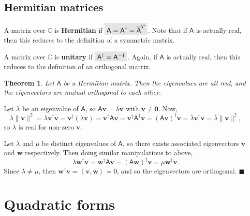 \documentclass[letter-paper]{tufte-book}
\newtheorem{theorem}{\color{pastel-blue}Theorem}[section]
\newenvironment{proof}[1][Proof]{\begin{trivlist}
\item[\hskip \labelsep {\bfseries #1}]}{\end{trivlist}}
\newcommand{\inner}[2]{\left\langle #1, #2\right\rangle}
\newcommand{\As}{{\mathsf{A}}}
\newcommand{\Ob}{{\boldsymbol{0}}}
\newcommand{\vb}{{\boldsymbol{v}}}
\newcommand{\wb}{{\boldsymbol{w}}}
\newcommand{\qed}{\hfill$\blacksquare$}
\newcommand{\highlight}[1]{\mathchoice%
  {\colorbox{black!10}{$\displaystyle#1$}}%
  {\colorbox{black!10}{$\textstyle#1$}}%
  {\colorbox{black!10}{$\scriptstyle#1$}}%
  {\colorbox{black!10}{$\scriptscriptstyle#1$}}}%
\begin{document}
\section{Hermitian matrices}\label{sec:hermitian}

A matrix over $\mathbb{C}$ is \textbf{Hermitian} if $\highlight{\As = \As^\dagger = \overline{\As}^T}$. Note that if $\As$ is actually real, then this reduces to the definition of a symmetric matrix.

A matrix over $\mathbb{C}$ is \textbf{unitary} if $\highlight{\As^\dagger = \As^{-1}}$. Again, if $\As$ is actually real, then this reduces to the definition of an orthogonal matrix.

\begin{theorem}
  Let $\As$ be a Hermitian matrix. Then the eigenvalues are all real, and the eigenvectors are mutual orthogonal to each other.
\end{theorem}

\begin{proof}
  Let $\lambda$ be an eigenvalue of $\As$, so $\As\vb=\lambda\vb$ with $\vb\neq\Ob$. Now,
  \begin{equation*}
    \lambda\|\vb\|^2 = \lambda\vb^\dagger\vb = \vb^\dagger (\lambda\vb) = \vb^\dagger \As\vb = \vb^\dagger \As^\dagger\vb = (\As\vb)^\dagger \vb = \overline{\lambda}\vb^\dagger\vb = \overline{\lambda}\|\vb\|^2,
  \end{equation*}
  so $\lambda$ is real for non-zero $\vb$.
  
  Let $\lambda$ and $\mu$ be distinct eigenvalues of $\As$, so there exists associated eigenvectors $\vb$ and $\wb$ respectively. Then doing similar manipulations to above,
  \begin{equation*}
    \lambda\wb^\dagger\vb = \wb^\dagger \As\vb = (\As\wb)^\dagger \vb = \mu\wb^\dagger\vb.
  \end{equation*}
  Since $\lambda\neq\mu$, then $\wb^\dagger\vb = \inner{\vb}{\wb} = 0$, and so the eigenvectors are orthogonal. \qed
\end{proof}


\chapter{Quadratic forms}
\end{document}
